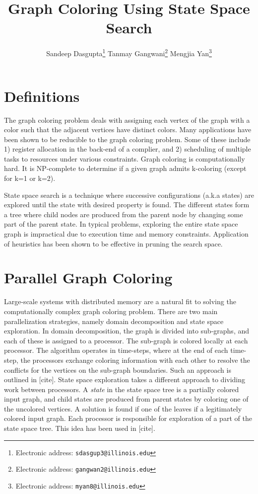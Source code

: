 \documentclass[10pt,twoside]{article}
\title{\textbf{Graph Coloring Using State Space Search}}
\author{Sandeep Dasgupta\thanks{Electronic address: \texttt{sdasgup3@illinois.edu}}
\qquad Tanmay Gangwani\thanks{Electronic address: \texttt{gangwan2@illinois.edu}}
\qquad  Mengjia Yan\thanks{Electronic address:
\texttt{myan8@illinois.edu}}}
\begin{document}
\thispagestyle{empty}

\maketitle
\section{Definitions}
  The graph coloring problem deals with assigning each vertex of the graph with a color such that the adjacent vertices have distinct colors. Many applications have been shown to be reducible to the graph coloring problem. Some of these include 1) register allocation in the back-end of a complier, and 2) scheduling of multiple tasks to resources under various constraints. Graph coloring is computationally hard. It is NP-complete to determine if a given graph admits k-coloring (except for k=1 or k=2).

  State space search is a technique where successive configurations (a.k.a states) are explored until the state with desired property is found. The different states form a tree where child nodes are produced from the parent node by changing some part of the parent state. In typical problems, exploring the entire state space graph is impractical due to execution time and memory constraints. Application of heuristics has been shown to be effective in pruning the search space.

\section{Parallel Graph Coloring}
Large-scale systems with distributed memory are a natural fit to solving the computationally complex graph coloring problem. There are two main parallelization strategies, namely domain decomposition and state space exploration. In domain decomposition, the graph is divided into sub-graphs, and each of these is assigned to a processor. The sub-graph is colored locally at each processor. The algorithm operates in time-steps, where at the end of each time-step, the processors exchange coloring information with each other to resolve the conflicts for the vertices on the sub-graph boundaries. Such an approach is outlined in [cite]. State space exploration takes a different approach to dividing work between processors. A \textit{state} in the state space tree is a partially colored input graph, and child states are produced from parent states by coloring one of the uncolored vertices. A solution is found if one of the leaves if a legitimately colored input graph. Each processor is responsible for exploration of a part of the state space tree. This idea has been used in [cite].
\end{document}
